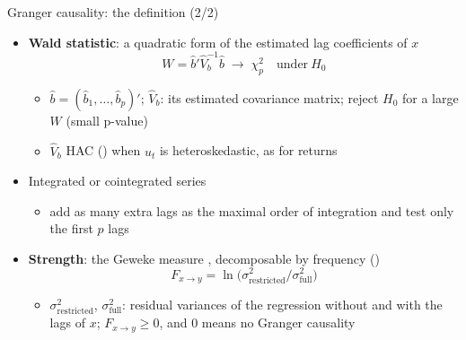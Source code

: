 \begin{frame}{Granger causality: the definition (2/2)}
\itemsize{\small}
\begin{itemize}
    \item \textbf{Wald statistic}: a quadratic form of the estimated lag coefficients of $x$ \[ W = \hat b'\hat V_b^{-1}\hat b \;\to\; \chi^2_p \quad \text{under} \ H_0 \]
    \begin{itemize}
        \item $\hat b = (\hat b_1, \dots, \hat b_p)'$; $\hat V_b$: its estimated covariance matrix; reject $H_0$ for a large $W$ (small p-value)
        \item $\hat V_b$ HAC () when $u_t$ is heteroskedastic, as for returns 
    \end{itemize}
    \item Integrated or cointegrated series 
    \begin{itemize}
        \item add as many extra lags as the maximal order of integration and test only the first $p$ lags
    \end{itemize}
    \item \textbf{Strength}: the Geweke measure , decomposable by frequency  () \[ F_{x\to y} = \ln\big(\sigma^2_{\mathrm{restricted}}/\sigma^2_{\mathrm{full}}\big) \]
    \begin{itemize}
        \item $\sigma^2_{\mathrm{restricted}}$, $\sigma^2_{\mathrm{full}}$: residual variances of the regression without and with the lags of $x$; $F_{x\to y} \ge 0$, and 0 means no Granger causality
    \end{itemize}
\end{itemize}
\end{frame}

